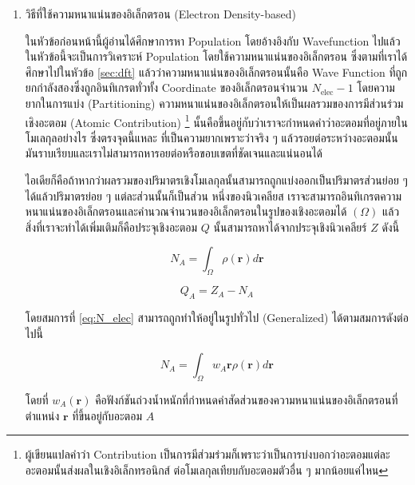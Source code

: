 \begin{enumerate}[topsep=0pt,noitemsep]
    \item วิธีที่ใช้ความหนาแน่นของอิเล็กตรอน (Electron Density-based)

          ในหัวข้อก่อนหน้านี้ผู้อ่านได้ศึกษาการหา Population โดยอ้างอิงกับ Wavefunction ไปแล้ว ในหัวข้อนี้จะเป็นการวิเคราะห์ Population
          โดยใช้ความหนาแน่นของอิเล็กตรอน ซึ่งตามที่เราได้ศึกษาไปในหัวข้อ \ref{sec:dft} แล้วว่าความหนาแน่นของอิเล็กตรอนนั้นคือ Wave
          Function ที่ถูกยกกำลังสองซึ่งถูกอินทิเกรตทั่วทั้ง Coordinate ของอิเล็กตรอนจำนวน $N_{\text{elec}} - 1$ โดยความยากในการแบ่ง%
          (Partitioning) ความหนาแน่นของอิเล็กตรอนให้เป็นผลรวมของการมีส่วนร่วมเชิงอะตอม (Atomic Contribution)%
          \footnote{ผู้เขียนแปลคำว่า Contribution เป็นการมีส่วมร่วมก็เพราะว่าเป็นการบ่งบอกว่าอะตอมแต่ละอะตอมนั้นส่งผลในเชิงอิเล็กทรอนิกส์%
              ต่อโมเลกุลเทียบกับอะตอมตัวอื่น ๆ มากน้อยแค่ไหน} นั้นคือขึ้นอยู่กับว่าเราจะกำหนดคำว่าอะตอมที่อยู่ภายในโมเลกุลอย่างไร ซึ่งตรงจุดนี้แหละ%
          ที่เป็นความยากเพราะว่าจริง ๆ แล้วรอยต่อระหว่างอะตอมนั้นมันราบเรียบและเราไม่สามารถหารอยต่อหรือขอบเขตที่ชัดเจนและแน่นอนได้

          ไอเดียก็คือถ้าหากว่าผลรวมของปริมาตรเชิงโมเลกุลนั้นสามารถถูกแบ่งออกเป็นปริมาตรส่วนย่อย ๆ ได้แล้วปริมาตรย่อย ๆ แต่ละส่วนนั้นก็เป็นส่วน%
          หนึ่งของนิวเคลียส เราจะสามารถอินทิเกรตความหนาแน่นของอิเล็กตรอนและคำนวณจำนวนของอิเล็กตรอนในรูปของเชิงอะตอมได้ $(\Omega)$
          แล้วสิ่งที่เราจะทำได้เพิ่มเติมก็คือประจุเชิงอะตอม $Q$ นั้นสามารถหาได้จากประจุเชิงนิวเคลียร์ $Z$ ดังนี้

          \begin{equation}\label{eq:N_elec}
              N_{A} = \int_{\Omega} \rho(\bm{r}) d\bm{r}
          \end{equation}

          \begin{equation}
              Q_{A} = Z_{A} - N_{A}
          \end{equation}

          \noindent โดยสมการที่ \eqref{eq:N_elec} สามารถถูกทำให้อยู่ในรูปทั่วไป (Generalized) ได้ตามสมการดังต่อไปนี้

          \begin{equation}\label{eq:N_elec_general}
              N_{A} = \int_{\Omega} w_{A}\bm{r} \rho(\bm{r}) d\bm{r}
          \end{equation}

          \noindent โดยที่ $w_{A}(\bm{r})$ คือฟังก์ชันถ่วงน้ำหนักที่กำหนดค่าสัดส่วนของความหนาแน่นของอิเล็กตรอนที่ตำแหน่ง $\bm{r}$
          ที่ขึ้นอยู่กับอะตอม $A$


\end{enumerate}
